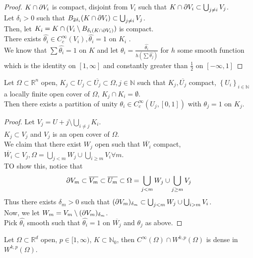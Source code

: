 \documentclass[../main.tex]{subfiles}
\begin{document}
\begin{proof}
$K\cap \partial V_i$ is compact, disjoint from $V_i$ such that $K\cap \partial V_i \subset \bigcup_{j \neq i} V_j$.\\
Let $\delta_i>0$ such that $ B_{2\delta_i} ( K\cap \partial V_i) \subset \bigcup_{j \neq i} V_j$.\\
Then, let $K_i = K \cap ( V_i \setminus B_{\delta_i( K\cap \partial V_i) } ) $ is compact.\\
There exists $ \hat{\theta_i}\in C^{ \infty }_c( V_i) , \hat{\theta_i}=1$ on $K_i$ .\\
We know that $\sum \hat{\theta_i}= 1$ on $K$ and let $\theta_i = \frac{ \hat{\theta_i}}{h( \sum \hat{\theta_j}) }$ for $h$ some smooth function which is  the identity on $[1, \infty ]$ and constantly greater than $\frac{1}{2}$ on $ [  - \infty , 1] $ 
\end{proof}
\begin{lemma}
Let $\Omega \subset \mathbb{R}^n$ open, $K_j \subset U_j \subset \overline{U_j}\subset \Omega, j \in \mathbb{N}$ such that $K_j, \overline{U_j}$ compact, $ \left\{ U_i \right\}_{i \in \mathbb{N}} $ a locally finite open cover of $\Omega$, $K_j \cap K_i = \emptyset$.\\
Then there exists a partition of unity $\theta_i \in C^{ \infty }_c ( U_j, [ 0,1] ) $ with $\theta_j = 1 $ on $K_j$.
\end{lemma}
\begin{proof}
	Let $V_j = U+j \setminus \bigcup_{i \neq j} K_i$.\\
	$K_j \subset V_j$ and $V_j$ is an open cover of $\Omega$.\\
	We claim that there exist $W_j$ open such that $ \overline{W_i}$ compact, $ \overline{W_i}\subset V_j, \Omega = \bigcup_{j <m} W_j \cup \bigcup_{i \geq m} V_i \forall m$.\\
	TO show this, notice that
	\[ 
	\partial V_m \subset \overline{V_m} \subset \overline{U_m} \subset \Omega = \bigcup_{j < m} W_j \cup \bigcup_{j \geq m} V_j 
	\]
Thus there exists $\delta_m >0 $ such that $( \partial V_m) _{\delta_m} \subset \bigcup_{j <m} W_j \cup \bigcup_{i >m } V_i$.\\
Now, we let $W_m = V_m \setminus ( \partial V_m)_{\delta_m} $.\\
Pick $ \hat{\theta_i}$ smooth such that $ \hat{\theta_i}=1$ on $\overline{W_j}$ and $\theta_j$ as above.
\end{proof}
\begin{thm}
	Let $\Omega \subset \mathbb{R}^{d}$ open, $p \in [ 1, \infty ) $, $K \subset \mathbb{N}_0$, then $C^{ \infty }( \Omega) \cap W^{k,p}( \Omega) $ is dense in $W^{k,p}( \Omega) $.
\end{thm}
\end{document}
